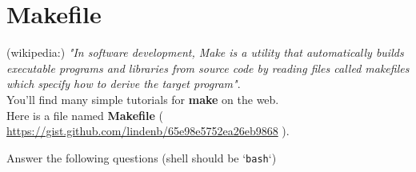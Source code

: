 \documentclass{article}
\newcommand{\code}[1]{`\texttt{#1}`}
\begin{document}
\section{Makefile}
\noindent
(wikipedia:) \emph{"In software development, Make is a utility that automatically builds executable programs and libraries from source code by reading files called makefiles which specify how to derive the target program"}.\\You'll find many simple tutorials for \textbf{make} on the web.\\

Here is a file named \textbf{Makefile} ( \url{https://gist.github.com/lindenb/65e98e5752ea26eb9868} ).


Answer the following questions (shell should be \code{bash})
\end{document}
